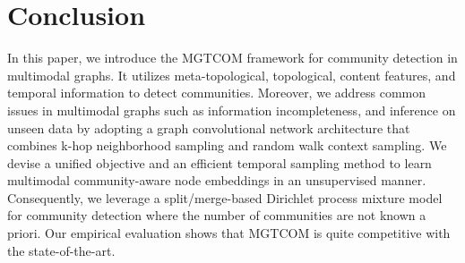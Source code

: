 \chapter{Conclusion}
In this paper, we introduce the MGTCOM framework for community detection in multimodal graphs.  It utilizes meta-topological, topological, content features, and temporal information to detect communities.
Moreover, we address common issues in multimodal graphs such as information incompleteness, and inference on unseen data by adopting a graph convolutional network architecture that combines k-hop neighborhood sampling and random walk context sampling.
We devise a unified objective and an efficient temporal sampling method to learn multimodal community-aware node embeddings in an unsupervised manner.
Consequently, we leverage a split/merge-based Dirichlet process mixture model for community detection where the number of communities are not known a priori.
Our empirical evaluation shows that MGTCOM is quite competitive with the state-of-the-art. 
